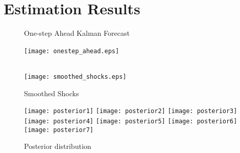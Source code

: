 \documentclass[11pt, a4paper]{article}
\begin{document}
\section{Estimation Results}

\begin{figure}[h]\begin{center}
\caption{One-step Ahead Kalman Forecast}
\texttt{[image: onestep\_ahead.eps]}~\\~
\caption{Smoothed Shocks}
\texttt{[image: smoothed\_shocks.eps]}

\end{center}
\end{figure}


\begin{figure}[t]
\caption{Posterior distribution}
\texttt{[image: posterior1]}
\texttt{[image: posterior2]}
\texttt{[image: posterior3]}
\texttt{[image: posterior4]}
\texttt{[image: posterior5]}
\texttt{[image: posterior6]}
\texttt{[image: posterior7]}

\end{figure}


\end{document}

